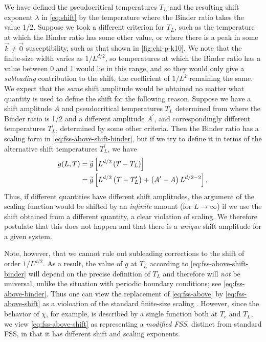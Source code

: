 We have defined the pseudocritical temperatures $T_L$ and the resulting shift
exponent $\lambda$ in \cref{eq:shift} by the temperature where the Binder ratio
takes the value 1/2. Suppose we took a different criterion for $T_L$, such as
the temperature at which the Binder ratio has some other value, or where there
is a peak in some $\vec{k}\neq\vec{0}$ susceptibility, such as that shown in
\cref{fig:chi-p-k10}. We note that the finite-size width varies as $1/L^{d/2}$,
so temperatures at which the Binder ratio has a value between 0 and 1 would lie
in this range, and so they would only give a \emph{subleading} contribution to
the shift, the coefficient of $1/L^2$ remaining the same. We expect that the
\emph{same} shift amplitude would be obtained no matter what quantity is used
to define the shift for the following reason. Suppose we have a shift amplitude
$A$ and pseudocritical temperatures $T_L$ determined from where the Binder
ratio is 1/2 and a different amplitude $A^{\prime}$, and correspondingly
different temperatures $T_L^{\prime}$, determined by some other criteria. Then
the Binder ratio has a scaling form in \cref{eq:fss-above-shift-binder}, but if
we try to define it in terms of the alternative shift temperatures
$T_L^{\prime}$, we have
\begin{align}
  g(L,T)
  &= \widetilde{g}\left[L^{d/2}\left(T-T_L\right)\right] \\
  &= \widetilde{g}\left[L^{d/2}\left(T-T_L^{\prime}\right) +
     \left(A^{\prime}-A\right)L^{d/2-2}\right].
\end{align}
Thus, if different quantities have different shift amplitudes, the argument of
the scaling function would be shifted by an \emph{infinite} amount (for
$L\to\infty$) if we use the shift obtained from a different quantity, a clear
violation of scaling. We therefore postulate that this does not happen and that
there is a \emph{unique} shift amplitude for a given system.

Note, however, that we cannot rule out subleading corrections to the shift of
order $1/L^{d/2}$. As a result, the value of $g$ at $T_L$ according to
\cref{eq:fss-above-shift-binder} will depend on the precise definition of $T_L$
and therefore will \emph{not} be universal, unlike the situation with periodic
boundary conditions; see \cref{eq:fss-above-binder}. Thus one can view the
replacement of \cref{eq:fss-above} by \cref{eq:fss-above-shift} as a violoation
of the standard finite-size scaling \autocite{rudnick1985effect}.
However, since the behavior of $\chi$, for example, is described by a single
function both at $T_c$ and $T_L$, we view \cref{eq:fss-above-shift} as
representing a \emph{modified FSS}, distinct from standard FSS, in that it has
different shift and scaling exponents.


